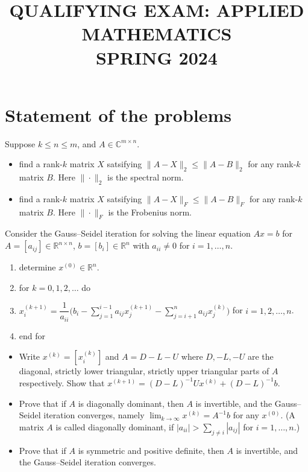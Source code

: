 \documentclass[11pt,a4paper]{article}
\title{\textbf{QUALIFYING EXAM: APPLIED MATHEMATICS}\\[0.5em]\Large SPRING 2024}
\date{}
\author{}
\newcommand{\examstatement}[1]{%
  \par\addvspace{0.85em}%
  \noindent{\bfseries #1}\par\nobreak\addvspace{0.28em}%
}
\begin{document}
\maketitle
\vspace{-3em}

\tableofcontents

\section{Statement of the problems}

\examstatement{Problem 1. [15 points]}
Suppose \(k \leqslant n \leqslant m\), and \(A \in \mathbb{C}^{m \times n}\).
\begin{itemize}
    \item find a rank-\(k\) matrix \(X\) satsifying \(\|A - X\|_{2} \leqslant \|A - B\|_{2}\) for any rank-\(k\) matrix \(B\). Here \(\|\cdot\|_{2}\) is the spectral norm.
    \item find a rank-\(k\) matrix \(X\) satsifying \(\|A - X\|_{F} \leqslant \|A - B\|_{F}\) for any rank-\(k\) matrix \(B\). Here \(\|\cdot\|_{F}\) is the Frobenius norm.
\end{itemize}

\examstatement{Problem 2. [20 points]}
Consider the Gauss--Seidel iteration for solving the linear equation \(Ax = b\) for \(A = [a_{ij}] \in \mathbb{R}^{n \times n}\), \(b = [b_{i}] \in \mathbb{R}^{n}\) with \(a_{ii} \neq 0\) for \(i = 1, \dots, n\).
\begin{enumerate}[label=\arabic*:,leftmargin=2em]
    \item determine \(x^{(0)} \in \mathbb{R}^{n}\).
    \item for \(k = 0, 1, 2, \dots\) do
    \item \(x_{i}^{(k+1)} = \dfrac{1}{a_{ii}} \bigl( b_{i} - \sum_{j=1}^{i-1} a_{ij} x_{j}^{(k+1)} - \sum_{j=i+1}^{n} a_{ij} x_{j}^{(k)} \bigr)\) for \(i = 1, 2, \dots, n\).
    \item end for
\end{enumerate}
\begin{itemize}
    \item Write \(x^{(k)} = [x_{i}^{(k)}]\) and \(A = D - L - U\) where \(D, -L, -U\) are the diagonal, strictly lower triangular, strictly upper triangular parts of \(A\) respectively. Show that \(x^{(k+1)} = (D - L)^{-1} U x^{(k)} + (D - L)^{-1} b\).
    \item Prove that if \(A\) is diagonally dominant, then \(A\) is invertible, and the Gauss--Seidel iteration converges, namely \(\lim_{k \to \infty} x^{(k)} = A^{-1} b\) for any \(x^{(0)}\). (A matrix \(A\) is called diagonally dominant, if \(|a_{ii}| > \sum_{j \neq i} |a_{ij}|\) for \(i = 1, \dots, n\).)
    \item Prove that if \(A\) is symmetric and positive definite, then \(A\) is invertible, and the Gauss--Seidel iteration converges.
\end{itemize}
\end{document}
